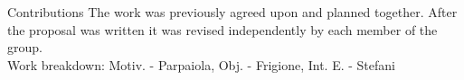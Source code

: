 \begin{projsection}{Contributions}
	The work was previously agreed upon and planned together.
	After the proposal was written it was revised independently by each member of the group.\\
	Work breakdown: Motiv. - Parpaiola, Obj. - Frigione, Int. E. - Stefani
\end{projsection}